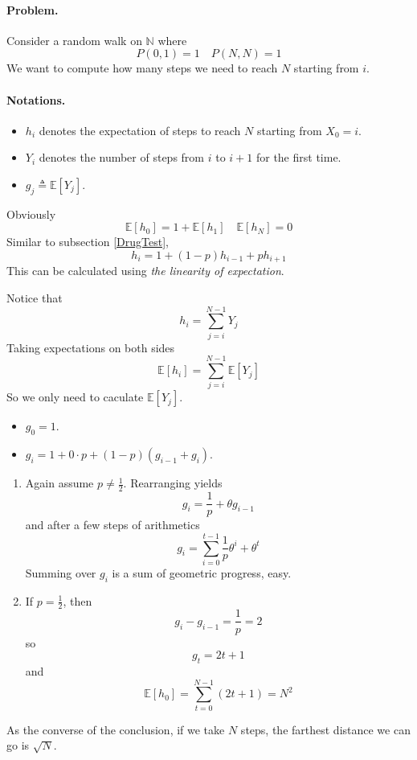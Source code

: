     \paragraph*{Problem.} Consider a random walk on $\mathbb{N}$ where
    \[ P(0,1) = 1 \quad P(N,N) = 1 \]
    We want to compute how many steps we need to reach $N$ starting from $i$.
    \paragraph*{Notations.}
    \begin{itemize}
        \item $h_i$ denotes the expectation of steps to reach $N$ starting from $X_0=i$.
        \item $Y_i$ denotes the number of steps from $i$ to $i+1$ for the first time.
        \item $g_j \triangleq \mathbb{E}[Y_j]$.
    \end{itemize}
    Obviously
    \[ \mathbb{E}[h_0] = 1 + \mathbb{E}[h_1] \quad \mathbb{E}[h_N] = 0 \]
    Similar to subsection \ref{DrugTest},
    \[ h_i = 1+ (1-p)h_{i-1} + ph_{i+1} \]
    This can be calculated using \emph{the linearity of expectation}. 

    Notice that
    \[ h_i = \sum_{j=i}^{N-1}Y_j \]
    Taking expectations on both sides
    \[ \mathbb{E}[h_i] = \sum_{j=i}^{N-1}\mathbb{E}[Y_j] \]
    So we only need to caculate $\mathbb{E}[Y_j]$.
    \begin{itemize}
        \item $g_0 = 1$.
        \item $g_i = 1 + 0 \cdot p + (1-p)(g_{i-1}+g_i)$.
    \end{itemize}
    \begin{enumerate}
        \item Again assume $p \neq \frac{1}{2}$. 
        Rearranging yields
        \[ g_i = \frac{1}{p} + \theta g_{i-1} \]
        and after a few steps of arithmetics
        \[ g_i = \sum_{i=0}^{t-1}\frac{1}{p}\theta^i + \theta^t \]
        Summing over $g_i$ is a sum of geometric progress, easy.
        \item If $p = \frac{1}{2}$, then
        \[ g_{i} - g_{i-1} = \frac{1}{p} = 2 \]
        so
        \[ g_t = 2t + 1 \]
        and
        \[ \mathbb{E}[h_0] = \sum_{t=0}^{N-1}(2t+1) = N^2 \]
    \end{enumerate}
    \begin{remark}
        As the converse of the conclusion, if we take $N$ steps, the farthest distance we can go is $\sqrt{N}$.
    \end{remark}

